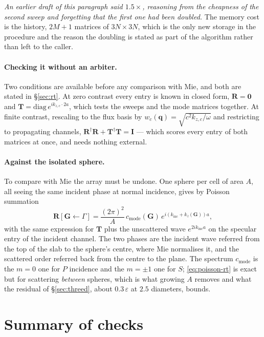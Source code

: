 \documentclass[11pt,a4paper]{article}
\newcommand{\bI}{\mathbf{I}}
\newcommand{\bT}{\mathbf{T}}
\newcommand{\bR}{\mathbf{R}}
\begin{document}
\emph{An earlier draft of this paragraph said $1.5\times$, reasoning from the
cheapness of the second sweep and forgetting that the first one had been
doubled.}  The memory cost is the history, $2M+1$ matrices of $3N\times3N$,
which is the only new storage in the procedure and the reason the doubling is
stated as part of the algorithm rather than left to the caller.

\paragraph{Checking it without an arbiter.}  Two conditions are available before
any comparison with Mie, and both are stated in \S\ref{sec:rt}.  At zero
contrast every entry is known in closed form, $\bR=\mathbf{0}$ and
$\bT=\mathrm{diag}\,e^{ik_{z,c}\cdot2a}$, which tests the sweeps and the mode
matrices together.  At finite contrast, rescaling to the flux basis by
$w_c(\mathbf{q})=\sqrt{c^{2}k_{z,c}/\omega}$ and restricting to propagating
channels, $\bR^{\dagger}\bR+\bT^{\dagger}\bT=\bI$ --- which scores every entry
of both matrices at once, and needs nothing external.

\paragraph{Against the isolated sphere.}  To compare with Mie the array must be
undone.  One sphere per cell of area $A$, all seeing the same incident phase at
normal incidence, gives by Poisson summation
\begin{equation}\label{eq:poisson-rt}
  \bR[\mathbf{G}\!\leftarrow\!\Gamma]
  = \frac{(2\pi)^2}{A}\,c_{\mathrm{mode}}(\mathbf{G})\,
    e^{i(k_{\mathrm{inc}}+k_z(\mathbf{G}))a},
\end{equation}
with the same expression for $\bT$ plus the unscattered wave
$e^{2ik_{\mathrm{inc}}a}$ on the specular entry of the incident channel.  The
two phases are the incident wave referred from the top of the slab to the
sphere's centre, where Mie normalises it, and the scattered order referred back
from the centre to the plane.  The spectrum $c_{\mathrm{mode}}$ is the $m=0$ one
for $P$ incidence and the $m=\pm1$ one for $S$; \eqref{eq:poisson-rt} is exact
but for scattering \emph{between} spheres, which is what growing $A$ removes and
what the residual of \S\ref{sec:threed}, about $0.3\,\varepsilon$ at $2.5$
diameters, bounds.

\section{Summary of checks}
\end{document}
